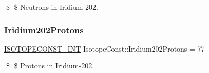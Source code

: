 \$ \$ Neutrons in Iridium-\/202. \mbox{\label{group___isotope_const-_iridium-_ir202_gaf37b2518ad8d0ba9faad4587b93efe15}} 
\subsubsection{\texorpdfstring{Iridium202\+Protons}{Iridium202Protons}}
{\footnotesize\ttfamily \mbox{\hyperlink{group___isotope_const-_macros_ga5f18360b3e99483a35c32d789e62621c}{I\+S\+O\+T\+O\+P\+E\+C\+O\+N\+S\+T\+\_\+\+I\+NT}} Isotope\+Const\+::\+Iridium202\+Protons = 77}

\$ \$ Protons in Iridium-\/202. 